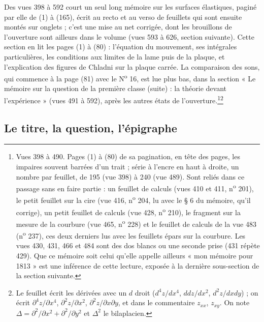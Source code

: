 \documentclass[11pt,a4paper]{article}
\begin{document}
Des vues 398 à 592 court un seul long mémoire sur les surfaces élastiques, paginé par
elle de (1) à (165), écrit au recto et au verso de feuillets qui sont ensuite montés
sur onglets ; c'est une mise au net corrigée, dont les brouillons de l'ouverture sont
ailleurs dans le volume (vues 593 à 626, section suivante). Cette section en lit les
pages (1) à (80) : l'équation du mouvement, ses intégrales particulières, les
conditions aux limites de la lame puis de la plaque, et l'explication des figures de
Chladni sur la plaque carrée. La comparaison des sons, qui commence à la page (81)
avec le N\textsuperscript{o} 16, est lue plus bas, dans la section « Le mémoire
sur la question de la première classe (suite) : la théorie devant l'expérience »
(vues 491 à 592), après les autres états de l'ouverture.\footnote{Vues 398 à 490. Pages (1) à (80) de sa pagination, en tête des
pages, les impaires souvent barrées d'un trait ; série à l'encre en haut à droite, un
nombre par feuillet, de 195 (vue 398) à 240 (vue 489). Sont reliés dans ce passage
sans en faire partie : un feuillet de calculs (vues 410 et 411, n\textsuperscript{o}
201), le petit feuillet sur la cire (vue 416, n\textsuperscript{o} 204, lu avec le
§ 6 du mémoire, qu'il corrige), un petit feuillet de calculs (vue 428, n\textsuperscript{o}
210), le fragment sur la mesure de la courbure (vue 465, n\textsuperscript{o} 228) et
le feuillet de calculs de la vue 483 (n\textsuperscript{o} 237), ces deux derniers lus
avec les feuillets épars sur la courbure. Les vues 430, 431, 466 et 484 sont des dos
blancs ou une seconde prise (431 répète 429). Que ce mémoire soit celui qu'elle
appelle ailleurs « mon mémoire pour 1813 » est une inférence de cette lecture,
exposée à la dernière sous-section de la section suivante.}\footnote{Le feuillet
écrit les dérivées avec un $d$ droit ($d^4z/dx^4$, $ddz/dx^2$, $d^2z/dxdy$) ; on écrit
$\partial^4 z/\partial x^4$, $\partial^2 z/\partial x^2$, $\partial^2 z/\partial x\partial y$,
et dans le commentaire $z_{xx}$, $z_{xy}$. On note
$\Delta = \partial^2/\partial x^2 + \partial^2/\partial y^2$ et $\Delta^2$ le
bilaplacien.}

\subsection*{Le titre, la question, l'épigraphe}
\end{document}
